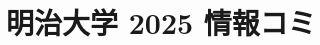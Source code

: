 \documentclass[../../uem_mat_mei_q.tex]{subfiles}
\begin{document}
    \section{明治大学 2025 情報コミ}
    \subsection{　}
    
    \newpage
    \subsection{　}
    
    \newpage
    \subsection{　}
    
    \clearpage
    \subsection{　}
    
\end{document}
